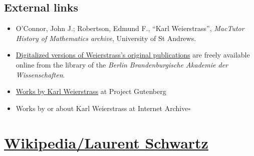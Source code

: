\documentclass{book}
\numberwithin{equation}{section}
\begin{document}
\section{External links}
\begin{itemize}
    \item O'Connor, John J.; Robertson, Edmund F., ``Karl Weierstrass'', \textit{MacTutor History of Mathematics archive}, University of St Andrews.
    \item \href{http://bibliothek.bbaw.de/bibliothek-digital/digitalequellen/schriften/autoren/weierstr/}{Digitalized versions of Weierstrass's original publications} are freely available online from the library of the \textit{Berlin Brandenburgische Akademie der Wissenschaften}.
    \item \href{https://www.gutenberg.org/author/Weierstrass,+Karl}{Works by Karl Weierstrass} at Project Gutenberg
    \item Works by or about Karl Weierstrass at Internet Archive\hfill$\square$
\end{itemize}


\chapter{\href{https://en.wikipedia.org/wiki/Laurent_Schwartz}{Wikipedia/Laurent Schwartz}}
\end{document}
